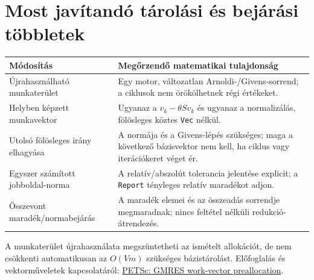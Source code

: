 \documentclass[11pt,a4paper]{article}
\begin{document}
\section{Most javítandó tárolási és bejárási többletek}
\begin{tabularx}{\linewidth}{@{}lX@{}}\toprule
Módosítás & Megőrzendő matematikai tulajdonság\\\midrule
Újrahasználható munkaterület & Egy motor, változatlan Arnoldi-/Givens-sorrend; a ciklusok nem örökölhetnek régi értékeket.\\
Helyben képzett munkavektor & Ugyanaz a $v_k-\theta Sv_k$ és ugyanaz a normalizálás, fölösleges köztes \texttt{Vec} nélkül.\\
Utolsó fölösleges irány elhagyása & A normája és a Givens-lépés szükséges; maga a következő bázisvektor nem kell, ha ciklus vagy iterációkeret véget ér.\\
Egyszer számított jobboldal-norma & A relatív/abszolút tolerancia jelentése explicit; a \texttt{Report} tényleges relatív maradékot adjon.\\
Összevont maradék/normabejárás & A maradék elemei és az összeadás sorrendje megmaradnak; nincs feltétel nélküli redukció-átrendezés.\\\bottomrule
\end{tabularx}

A munkaterület újrahasználata megszüntetheti az ismételt allokációt, de nem
csökkenti automatikusan az $O(Vm)$ szükséges bázistárolást. Előfoglalás és
vektorműveletek kapcsolatáról:
\href{https://petsc.org/release/manualpages/KSP/KSPGMRESSetPreAllocateVectors/}{PETSc: GMRES work-vector preallocation}.
\end{document}
